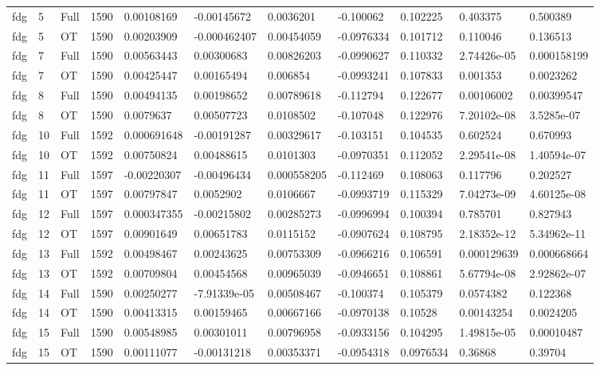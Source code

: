 \begin{landscape}
\begin{longtable}{lllllllllll}
fdg & 5 & Full & 1590 & 0.00108169 & -0.00145672 & 0.0036201 & -0.100062 & 0.102225 & 0.403375 & 0.500389 \\
fdg & 5 & OT & 1590 & 0.00203909 & -0.000462407 & 0.00454059 & -0.0976334 & 0.101712 & 0.110046 & 0.136513 \\
fdg & 7 & Full & 1590 & 0.00563443 & 0.00300683 & 0.00826203 & -0.0990627 & 0.110332 & 2.74426e-05 & 0.000158199 \\
fdg & 7 & OT & 1590 & 0.00425447 & 0.00165494 & 0.006854 & -0.0993241 & 0.107833 & 0.001353 & 0.0023262 \\
fdg & 8 & Full & 1590 & 0.00494135 & 0.00198652 & 0.00789618 & -0.112794 & 0.122677 & 0.00106002 & 0.00399547 \\
fdg & 8 & OT & 1590 & 0.0079637 & 0.00507723 & 0.0108502 & -0.107048 & 0.122976 & 7.20102e-08 & 3.5285e-07 \\
fdg & 10 & Full & 1592 & 0.000691648 & -0.00191287 & 0.00329617 & -0.103151 & 0.104535 & 0.602524 & 0.670993 \\
fdg & 10 & OT & 1592 & 0.00750824 & 0.00488615 & 0.0101303 & -0.0970351 & 0.112052 & 2.29541e-08 & 1.40594e-07 \\
fdg & 11 & Full & 1597 & -0.00220307 & -0.00496434 & 0.000558205 & -0.112469 & 0.108063 & 0.117796 & 0.202527 \\
fdg & 11 & OT & 1597 & 0.00797847 & 0.0052902 & 0.0106667 & -0.0993719 & 0.115329 & 7.04273e-09 & 4.60125e-08 \\
fdg & 12 & Full & 1597 & 0.000347355 & -0.00215802 & 0.00285273 & -0.0996994 & 0.100394 & 0.785701 & 0.827943 \\
fdg & 12 & OT & 1597 & 0.00901649 & 0.00651783 & 0.0115152 & -0.0907624 & 0.108795 & 2.18352e-12 & 5.34962e-11 \\
fdg & 13 & Full & 1592 & 0.00498467 & 0.00243625 & 0.00753309 & -0.0966216 & 0.106591 & 0.000129639 & 0.000668664 \\
fdg & 13 & OT & 1592 & 0.00709804 & 0.00454568 & 0.00965039 & -0.0946651 & 0.108861 & 5.67794e-08 & 2.92862e-07 \\
fdg & 14 & Full & 1590 & 0.00250277 & -7.91339e-05 & 0.00508467 & -0.100374 & 0.105379 & 0.0574382 & 0.122368 \\
fdg & 14 & OT & 1590 & 0.00413315 & 0.00159465 & 0.00667166 & -0.0970138 & 0.10528 & 0.00143254 & 0.0024205 \\
fdg & 15 & Full & 1590 & 0.00548985 & 0.00301011 & 0.00796958 & -0.0933156 & 0.104295 & 1.49815e-05 & 0.00010487 \\
fdg & 15 & OT & 1590 & 0.00111077 & -0.00131218 & 0.00353371 & -0.0954318 & 0.0976534 & 0.36868 & 0.39704 \\

\end{longtable}
\end{landscape}
